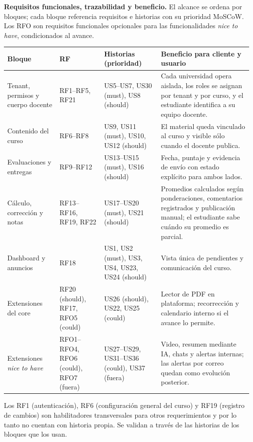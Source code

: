 \documentclass[letterpaper,10pt]{article}
\begin{document}
\textbf{Requisitos funcionales, trazabilidad y beneficio.} El alcance se ordena por bloques; cada bloque referencia requisitos e historias con su prioridad MoSCoW. Los RFO son requisitos funcionales opcionales para las funcionalidades \emph{nice to have}, condicionados al avance.

{\small
\begin{tabularx}{\textwidth}{|p{2.5cm}|p{2.05cm}|Y|Y|}
\hline
\textbf{Bloque} & \textbf{RF} & \textbf{Historias (prioridad)} & \textbf{Beneficio para cliente y usuario} \\
\hline
Tenant, permisos y cuerpo docente & RF1--RF5, RF21 & US5--US7, US30 (must), US8 (should) & Cada universidad opera aislada, los roles se asignan por tenant y por curso, y el estudiante identifica a su equipo docente. \\
\hline
Contenido del curso & RF6--RF8 & US9, US11 (must), US10, US12 (should) & El material queda vinculado al curso y visible sólo cuando el docente publica. \\
\hline
Evaluaciones y entregas & RF9--RF12 & US13--US15 (must), US16 (should) & Fecha, puntaje y evidencia de envío con estado explícito para ambos lados. \\
\hline
Cálculo, corrección y notas & RF13--RF16, RF19, RF22 & US17--US20 (must), US21 (should) & Promedios calculados según ponderaciones, comentarios registrados y publicación manual; el estudiante sabe cuándo su promedio es parcial. \\
\hline
Dashboard y anuncios & RF18 & US1, US2 (must), US3, US4, US23, US24 (should) & Vista única de pendientes y comunicación del curso. \\
\hline
Extensiones del core & RF20 (should), RF17, RFO5 (could) & US26 (should), US22, US25 (could) & Lector de PDF en plataforma; recorrección y calendario interno si el avance lo permite. \\
\hline
Extensiones \emph{nice to have} & RFO1--RFO4, RFO6 (could), RFO7 (fuera) & US27--US29, US31--US36 (could), US37 (fuera) & Video, resumen mediante IA, chats y alertas internas; las alertas por correo quedan como evolución posterior. \\
\hline
\end{tabularx}}

Los RF1 (autenticación), RF6 (configuración general del curso) y RF19 (registro de cambios) son habilitadores transversales para otros requerimientos y por lo tanto no cuentan con historia propia. Se validan a través de las historias de los bloques que los usan.
\end{document}

